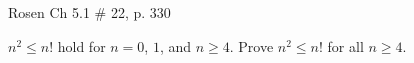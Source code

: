 \begin{questions}










 Rosen Ch 5.1 \# 22, p. 330
    \ifprintanswers
        \vspace{-10pt}
   \fi
\begin{solution}
$n^2 \leq n!$ hold for $n=0$, $1$, and $n \geq 4$.  Prove $n^2 \leq n!$ for all $n \geq 4$.


\end{solution}
\end{questions}
